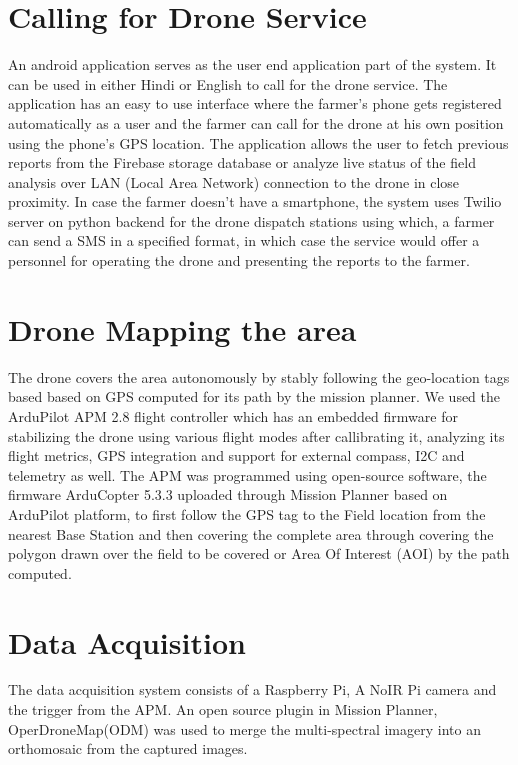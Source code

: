\section{Calling for Drone Service}
An android application serves as the user end application part of the system. It can be used in either Hindi or English to call for the drone service. The application has an easy to use interface where the farmer's phone gets registered automatically as a user and the farmer can call for the drone at his own position using the phone's GPS location. The application allows the user to fetch previous reports from the Firebase storage database or analyze live status of the field analysis over LAN (Local Area Network) connection to the drone in close proximity. In case the farmer doesn't have a smartphone, the system uses Twilio server on python backend for the drone dispatch stations using which, a farmer can send a SMS in a specified format, in which case the service would offer a personnel for operating the drone and presenting the reports to the farmer.
\section{Drone Mapping the area} The drone covers the area autonomously by stably following the geo-location tags based based on GPS computed for its path by the mission planner. We used the ArduPilot APM 2.8 flight controller which has an embedded firmware for stabilizing the drone using various flight modes after callibrating it, analyzing its flight metrics, GPS integration and support for external compass, I2C and telemetry as well. The APM was programmed using open-source software, the firmware ArduCopter 5.3.3 uploaded through Mission Planner based on ArduPilot platform, to first follow the GPS tag to the Field location from the nearest Base Station and then covering the complete area through covering the polygon drawn over the field to be covered or Area Of Interest (AOI) by the path computed.

\section{Data Acquisition} The data acquisition system consists of a Raspberry Pi, A NoIR Pi camera and the trigger from the APM. An open source plugin in Mission Planner, OperDroneMap(ODM) was used to merge the multi-spectral imagery into an orthomosaic from the captured images. 

